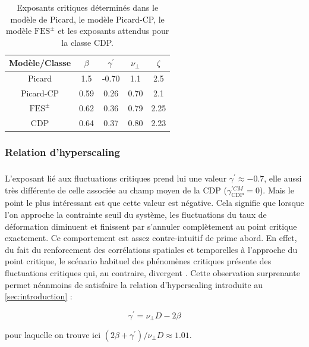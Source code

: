 \begin{table}
\centering
\begin{tabular}{ccccc}
\hline \hline Modèle/Classe & $\beta$ & \multicolumn{1}{c}{$\gamma^{\prime}$} & $\nu_{\perp}$ & $\zeta$ \\
\hline Picard & 1.5 & -0.70 & 1.1 & 2.5 \\
Picard-CP & 0.59 & 0.26 & 0.70 & 2.1 \\
$\text{FES}^\pm$ & 0.62 & 0.36 & 0.79 & 2.25 \\
CDP \cite{lubeck_universal_2004} & 0.64 & 0.37 & 0.80 & 2.23 \\
\hline \hline
\end{tabular}
\caption{Exposants critiques déterminés dans le modèle de Picard, le modèle Picard-CP, le modèle $\text{FES}^\pm$ et les exposants attendus pour la classe CDP.}
\label{tab:expocrit}
\end{table}

\subsubsection{Relation d'hyperscaling}

\subparagraph{}L'exposant lié aux fluctuations critiques prend lui une valeur $\gamma^\prime \approx -0.7$, elle aussi très différente de celle associée au champ moyen de la CDP ($\gamma^{\prime CM}_\text{CDP}=0$). Mais le point le plus intéressant est que cette valeur est négative. Cela signifie que lorsque l'on approche la contrainte seuil du système, les fluctuations du taux de déformation diminuent et finissent par s'annuler complètement au point critique exactement. Ce comportement est assez contre-intuitif de prime abord. En effet, du fait du renforcement des corrélations spatiales et temporelles à l'approche du point critique, le scénario habituel des phénomènes critiques présente des fluctuations critiques qui, au contraire, divergent \cite{kardar_statistical_2007}. Cette observation surprenante permet néanmoins de satisfaire la relation d'hyperscaling introduite au \autoref{sec:introduction} :

\begin{equation}
	\gamma^\prime = \nu_\perp D - 2\beta
	\label{eq:hyperscalingEPM}
\end{equation}

\noindent pour laquelle on trouve ici $(2\beta + \gamma^\prime) / \nu_\perp D\approx 1.01$.  

